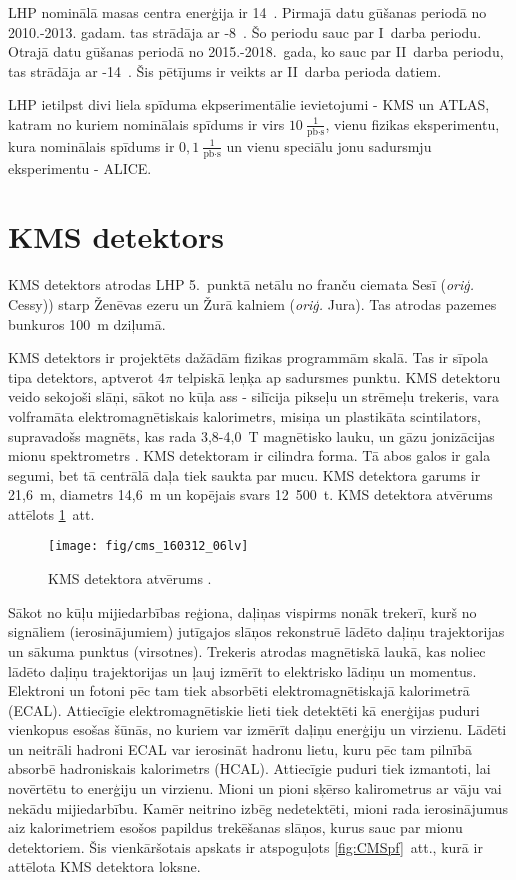 LHP nominālā masas centra enerģija ir 14~\TeV. Pirmajā datu gūšanas periodā no 2010.-2013. gadam. tas strādāja ar -8~\TeV. Šo periodu sauc par I~\gls{darba periodu}. Otrajā datu gūšanas periodā no 2015.-2018.~gada, ko sauc par II~darba periodu, tas strādāja ar -14~\TeV. Šis pētījums ir veikts ar II~darba perioda datiem.

LHP ietilpst divi liela spīduma ekpserimentālie ievietojumi - KMS un ATLAS, katram no kuriem nominālais spīdums ir virs $10~{\frac{1}{\text{pb}\cdot\text{s}}}$, vienu \cPqb fizikas eksperimentu, kura nominālais spīdums ir $0,1~\frac{1}{\text{pb}\cdot\text{s}}$ un vienu speciālu jonu sadursmju eksperimentu - ALICE. 

\section{KMS detektors}

KMS detektors atrodas LHP 5.~punktā netālu no franču ciemata Sesī (\textit{oriģ.} Cessy)) starp Ženēvas ezeru un Žurā kalniem (\textit{oriģ.} Jura). Tas atrodas pazemes bunkuros 100~m dziļumā. 

KMS detektors ir projektēts dažādām fizikas programmām \TeV skalā. Tas ir sīpola tipa detektors, aptverot $4\pi$ telpiskā leņķa ap sadursmes punktu. KMS detektoru veido sekojoši slāņi, sākot no kūļa ass - silīcija pikseļu un \gls{strēmeļu} trekeris, vara volframāta elektromagnētiskais kalorimetrs, misiņa un plastikāta scintilators, supravadošs magnēts, kas rada 3,8-4,0~T magnētisko lauku, un gāzu jonizācijas mionu spektrometrs \cite{Chatrchyan:2008aa}. KMS detektoram ir cilindra forma. Tā abos galos ir \gls{gala segumi}, bet tā centrālā daļa tiek saukta par \gls{mucu}. KMS detektora garums ir 21,6~m, diametrs 14,6~m un kopējais svars 12~500~t. KMS detektora atvērums attēlots \ref{fig:CMS_detector}~att.

\begin{figure}[hbtp]
\centering
\def\twidth{1}
\texttt{[image: fig/cms\_160312\_06lv]}
\caption{KMS detektora atvērums \cite{Sakuma:2013jqa}.}
\label{fig:CMS_detector}
\end{figure}

Sākot no kūļu mijiedarbības reģiona, daļiņas vispirms nonāk trekerī, kurš no signāliem (\gls{ierosinājumiem}) jutīgajos slāņos rekonstruē lādēto daļiņu trajektorijas un sākuma punktus (\gls{virsotnes}). Trekeris atrodas magnētiskā laukā, kas noliec lādēto daļiņu trajektorijas un ļauj izmērīt to elektrisko lādiņu un momentus. Elektroni un fotoni pēc tam tiek absorbēti elektromagnētiskajā kalorimetrā (ECAL). Attiecīgie elektromagnētiskie lieti tiek detektēti kā enerģijas \gls{puduri} vienkopus esošas šūnās, no kuriem var izmērīt daļiņu enerģiju un virzienu. Lādēti un neitrāli hadroni ECAL var ierosināt hadronu lietu, kuru pēc tam pilnībā absorbē hadroniskais kalorimetrs (HCAL). Attiecīgie puduri tiek izmantoti, lai novērtētu to enerģiju un virzienu.  Mioni un pioni sķērso kalirometrus ar vāju vai nekādu mijiedarbību. Kamēr neitrino izbēg nedetektēti, mioni rada ierosinājumus aiz kalorimetriem esošos papildus trekēšanas slāņos, kurus sauc par mionu detektoriem. Šis vienkāršotais apskats ir atspoguļots \ref{fig:CMSpf}~att., kurā ir attēlota KMS detektora loksne.

